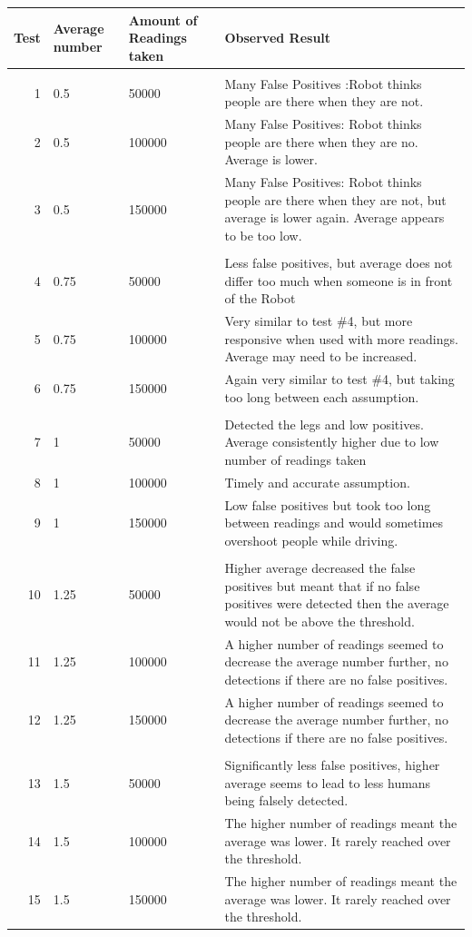 \documentclass{article}
\begin{document}
	\begin{longtable}{r | p{2cm} | p{2.5cm} | p{8cm} }
	Test & Average number & Amount of Readings taken & Observed Result \\
	\hline
	  &  &  \\[2ex]
	1 & 0.5 & 50000 & Many False Positives :Robot thinks people are there when they are not. \\[1ex]
	2 & 0.5 & 100000 & Many False Positives: Robot thinks people are there when they are no. Average is lower. \\ [1ex]
3 & 0.5 & 150000 & Many False Positives: Robot thinks people are there when they are not, but average is lower again. Average appears to be too low. \\ [0ex]

	  &  &  \\[2ex]
4 & 0.75 & 50000 & Less false positives, but average does not differ too much when someone is in front of the Robot \\[1ex] 
5 & 0.75 & 100000 & Very similar to test \#4, but more responsive when used with more readings. Average may need to be increased. \\ [0ex]
6 & 0.75 & 150000 & Again very similar to test \#4, but taking too long between each assumption. \\ [1ex]

	  &  &  \\[2ex]
7 & 1 & 50000 & Detected the legs and low positives. Average consistently higher due to low number of readings taken \\ [1ex]
8 & 1 & 100000 & Timely and  accurate assumption. \\ [2ex]
9 & 1 & 150000 & Low false positives but took too long between readings and would sometimes overshoot people while driving. \\ [1ex]

	  &  &  \\[2ex]
10 & 1.25 & 50000 & Higher average decreased the false positives but meant that if no false positives were detected then the average would not be above the threshold. \\ [0ex]
11 & 1.25 & 100000 & A higher number of readings seemed to decrease the average number further, no detections if there are no false positives. \\ [0ex]
12 & 1.25 & 150000 & A higher number of readings seemed to decrease the average number further, no detections if there are no false positives.  \\[0ex] 

	  &  &  \\[2ex]
13 & 1.5 & 50000 & Significantly less false positives, higher average seems to lead to less humans being falsely detected. \\ [1ex]
14 & 1.5 & 100000 & The higher number of readings meant the average was lower. It rarely reached over the threshold. \\ [1ex]
15 & 1.5 & 150000 & The higher number of readings meant the average was lower. It rarely reached over the threshold. \\[1ex]
	
	\end{longtable}
	
\end{document}

